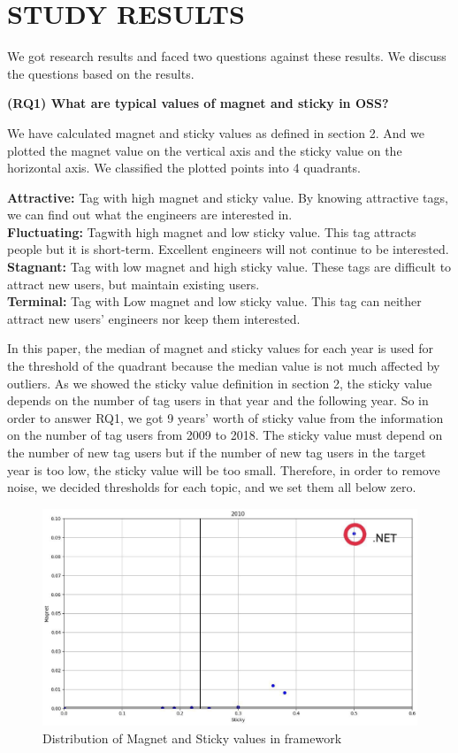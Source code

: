 \documentclass[conference]{IEEEtran}
\begin{document}
\section{STUDY RESULTS} %
We got research results and faced two questions against these results. We discuss the questions based on the results.
\smallskip
\smallskip

\textbf{(RQ1) What are typical values of magnet and sticky in OSS?}
\smallskip

We have calculated magnet and sticky values as defined in section 2. And we plotted the magnet value on the vertical axis and the sticky value on the horizontal axis. We classified the plotted points into 4 quadrants.
\smallskip
\smallskip

\textbf{Attractive:} Tag with high magnet and sticky value. By knowing attractive tags, we can find out what the engineers are interested in.\\
\textbf{Fluctuating:} Tagwith high magnet and low sticky value. This tag attracts people but it is short-term. Excellent engineers will not continue to be interested.\\
\textbf{Stagnant:} Tag with low magnet and high sticky value. These tags are difficult to attract new users, but maintain existing users.\\
\textbf{Terminal:} Tag with Low magnet and low sticky value. This tag can neither attract new users' engineers nor keep them interested.
\smallskip
\smallskip

In this paper, the median of magnet and sticky values for each year is used for the threshold of the quadrant because the median value is not much affected by outliers. As we showed the sticky value definition in section 2, the sticky value depends on the number of tag users in that year and the following year. So in order to answer RQ1, we got 9 years' worth of sticky value from the information on the number of tag users from 2009 to 2018. The sticky value must depend on the number of new tag users but if the number of new tag users in the target year is too low, the sticky value will be too small. Therefore, in order to remove noise, we decided thresholds for each topic, and we set them all below zero. 
\medskip

\begin{figure}[t]
 \centering
 \includegraphics[width=.9\hsize]{img/frame2010net.eps}  
 \caption{Distribution of Magnet and Sticky values in framework} 
 \label{fig:plotframe2010} 
\end{figure}
\end{document}
